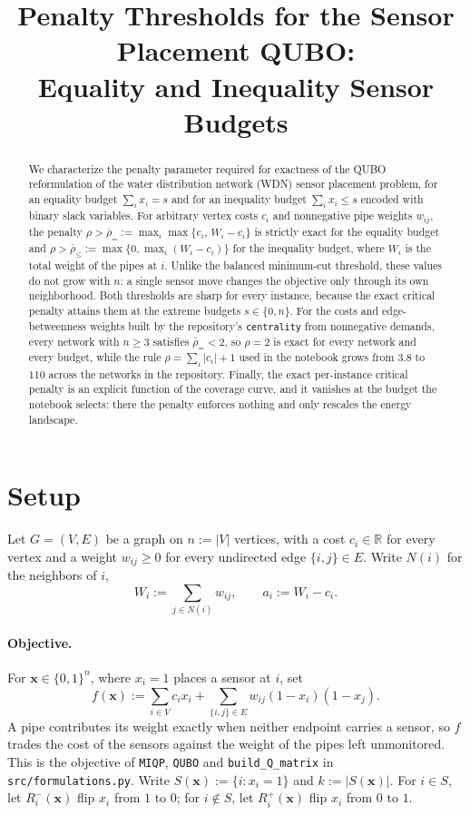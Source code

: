 \documentclass[11pt]{article}
\title{Penalty Thresholds for the Sensor Placement QUBO:\\
Equality and Inequality Sensor Budgets}
\author{}
\date{}
\newcommand{\x}{\mathbf{x}}
\begin{document}
\maketitle

\begin{abstract}
We characterize the penalty parameter required for exactness of the QUBO
reformulation of the water distribution network (WDN) sensor placement problem,
for an equality budget $\sum_i x_i=s$ and for an inequality budget
$\sum_i x_i\le s$ encoded with binary slack variables. For arbitrary vertex costs
$c_i$ and nonnegative pipe weights $w_{ij}$, the penalty
$\rho>\bar\rho_{=}:=\max_i\max\{c_i,\,W_i-c_i\}$ is strictly exact for the
equality budget and $\rho>\bar\rho_{\le}:=\max\{0,\max_i(W_i-c_i)\}$ for the
inequality budget, where $W_i$ is the total weight of the pipes at $i$. Unlike the
balanced minimum-cut threshold, these values do not grow with $n$: a single sensor
move changes the objective only through its own neighborhood. Both thresholds are
sharp for every instance, because the exact critical penalty attains them at the
extreme budgets $s\in\{0,n\}$. For the costs and edge-betweenness weights built
by the repository's \texttt{centrality} from nonnegative demands, every network
with $n\ge3$ satisfies $\bar\rho_{=}<2$, so $\rho=2$ is exact for every network
and every budget, while the rule $\rho=\sum_i|c_i|+1$ used in the notebook grows
from $3.8$ to $110$ across the networks in the repository. Finally, the exact per-instance critical penalty is
an explicit function of the coverage curve, and it vanishes at the budget the
notebook selects: there the penalty enforces nothing and only rescales the energy
landscape.
\end{abstract}

\section{Setup}
\label{sec:setup}

Let $G=(V,E)$ be a graph on $n:=|V|$ vertices, with a cost $c_i\in\mathbb R$ for
every vertex and a weight $w_{ij}\ge0$ for every undirected edge
$\{i,j\}\in E$. Write $N(i)$ for the neighbors of $i$,
\begin{equation}
W_i:=\sum_{j\in N(i)} w_{ij},
\qquad
a_i:=W_i-c_i .
\label{eq:Wa}
\end{equation}

\paragraph{Objective.}
For $\x\in\{0,1\}^n$, where $x_i=1$ places a sensor at $i$, set
\begin{equation}
f(\x):=\sum_{i\in V}c_ix_i+\sum_{\{i,j\}\in E}w_{ij}(1-x_i)(1-x_j).
\label{eq:obj}
\end{equation}
A pipe contributes its weight exactly when neither endpoint carries a sensor, so
$f$ trades the cost of the sensors against the weight of the pipes left
unmonitored. This is the objective of \texttt{MIQP}, \texttt{QUBO} and
\texttt{build\_Q\_matrix} in \texttt{src/formulations.py}. Write
$S(\x):=\{i:x_i=1\}$ and $k:=|S(\x)|$. For $i\in S$, let $R_i^-(\x)$ flip $x_i$
from $1$ to $0$; for $i\notin S$, let $R_i^+(\x)$ flip $x_i$ from $0$ to $1$.
\end{document}
